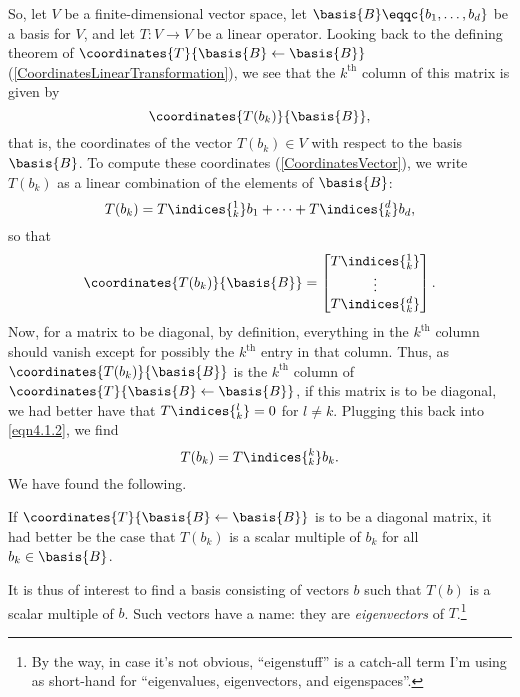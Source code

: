 So, let $V$ be a finite-dimensional vector space, let $\basis{B}\eqqc \{ b_1,\ldots ,b_d\}$ be a basis for $V$, and let $T\colon V\rightarrow V$ be a linear operator.  Looking back to the defining theorem of $\coordinates{T}{\basis{B}\leftarrow \basis{B}}$ (\cref{CoordinatesLinearTransformation}), we see that the $k^{\text{th}}$ column of this matrix is given by
\begin{equation}
	\coordinates{T(b_k)}{\basis{B}},
\end{equation}
that is, the coordinates of the vector $T(b_k)\in V$ with respect to the basis $\basis{B}$.  To compute these coordinates (\cref{CoordinatesVector}), we write $T(b_k)$ as a linear combination of the elements of $\basis{B}$:
\begin{equation}\label{eqn4.1.2}
	T(b_k)=T\indices{^1_k}b_1+\cdots +T\indices{^d_k}b_d,
\end{equation}
so that
\begin{equation}
	\coordinates{T(b_k)}{\basis{B}}=\begin{bmatrix}T\indices{^1_k} \\ \vdots \\ T\indices{^d_k}\end{bmatrix}.
\end{equation}
Now, for a matrix to be diagonal, by definition, everything in the $k^{\text{th}}$ column should vanish except for possibly the $k^{\text{th}}$ entry in that column.  Thus, as $\coordinates{T(b_k)}{\basis{B}}$ is the $k^{\text{th}}$ column of $\coordinates{T}{\basis{B}\leftarrow \basis{B}}$, if this matrix is to be diagonal, we had better have that $T\indices{^l_k}=0$ for $l\neq k$.  Plugging this back into \eqref{eqn4.1.2}, we find
\begin{equation}
	T(b_k)=T\indices{^k_k}b_k.
\end{equation}
We have found the following.
\begin{displayquote}
	If $\coordinates{T}{\basis{B}\leftarrow \basis{B}}$ is to be a diagonal matrix, it had better be the case that $T(b_k)$ is a scalar multiple of $b_k$ for all $b_k\in \basis{B}$.
\end{displayquote}

It is thus of interest to find a basis consisting of vectors $b$ such that $T(b)$ is a scalar multiple of $b$.  Such vectors have a name:  they are \emph{eigenvectors} of $T$.\footnote{By the way, in case it's not obvious, ``eigenstuff'' is a catch-all term I'm using as short-hand for ``eigenvalues, eigenvectors, and eigenspaces''.}

